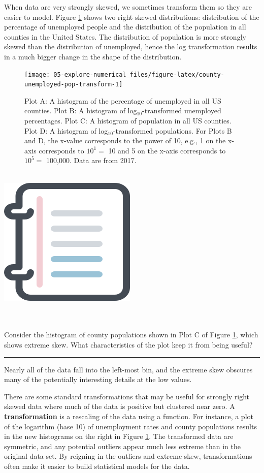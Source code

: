 \documentclass[
  10pt,
  openany]{book}
\newenvironment{mdframedwithfootGPWE}
{   
    \savenotes
    \begin{mdframed}[%
    topline=true, bottomline=true, linecolor=oiB, linewidth=0.5pt,
    rightline=false, leftline=false,
    backgroundcolor=oiLGray]
    \renewcommand{\thempfootnote}{\arabic{footnote}}
    }
{
    \end{mdframed}
    \spewnotes
}
\newenvironment{workedexample}{
    \let\oldrule\rule
    \renewcommand{\rule}[2]{\vspace{-2mm}\oldrule{##1}{##2}\vspace{-2mm}}
\vspace{4mm}
\begin{mdframedwithfootGPWE}
\begin{minipage}[t]{0.10\textwidth}
{$\:$ \\ \setkeys{Gin}{width=2.5em,keepaspectratio}\includegraphics{images/_icons/worked-example.png}}
\end{minipage}
\hfill
\begin{minipage}[t]{0.90\textwidth}
\vspace{-2mm}
\setlength{\parskip}{1em}
\noindent\textbf{\color{oiB}\small\fontfamily{phv}\selectfont{\MakeUppercase{Example}}} $\:$ \\ \\
}{\end{minipage}
\end{mdframedwithfootGPWE}
\vspace{4mm}
}
\begin{document}
When data are very strongly skewed, we sometimes transform them so they are easier to model.
Figure \ref{fig:county-unemployed-pop-transform} shows two right skewed distributions: distribution of the percentage of unemployed people and the distribution of the population in all counties in the United States.
The distribution of population is more strongly skewed than the distribution of unemployed, hence the log transformation results in a much bigger change in the shape of the distribution.

\begin{figure}[h]

{\centering \texttt{[image: 05-explore-numerical\_files/figure-latex/county-unemployed-pop-transform-1]} 

}

\caption{Plot A: A histogram of the percentage of unemployed in all US counties. Plot B: A histogram of log$_{10}$-transformed unemployed percentages. Plot C: A histogram of population in all US counties. Plot D: A histogram of log$_{10}$-transformed populations. For Plots B and D, the x-value corresponds to the power of 10, e.g., 1 on the x-axis corresponds to $10^1 =$ 10 and 5 on the x-axis corresponds to $10^5 =$ 100,000. Data are from 2017.}\label{fig:county-unemployed-pop-transform}
\end{figure}

\begin{workedexample}
Consider the histogram of county populations shown in Plot C of Figure \ref{fig:county-unemployed-pop-transform}, which shows extreme skew.
What characteristics of the plot keep it from being useful?

\begin{center}\rule{0.5\linewidth}{0.5pt}\end{center}

Nearly all of the data fall into the left-most bin, and the extreme skew obscures many of the potentially interesting details at the low values.

\end{workedexample}

There are some standard transformations that may be useful for strongly right skewed data where much of the data is positive but clustered near zero.
A \textbf{transformation} is a rescaling of the data using a function.
For instance, a plot of the logarithm (base 10) of unemployment rates and county populations results in the new histograms on the right in Figure \ref{fig:county-unemployed-pop-transform}.
The transformed data are symmetric, and any potential outliers appear much less extreme than in the original data set.
By reigning in the outliers and extreme skew, transformations often make it easier to build statistical models for the data.
\end{document}
